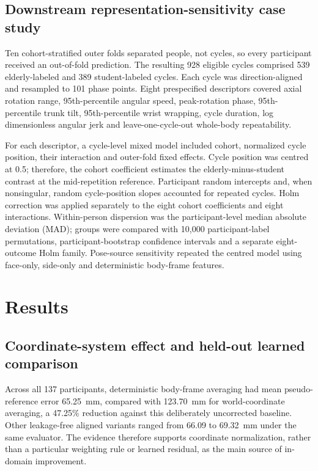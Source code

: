 \documentclass[lineno,pdflatex,sn-mathphys-num]{sn-jnl}
\begin{document}
\subsection{Downstream representation-sensitivity case study}

Ten cohort-stratified outer folds separated people, not cycles, so every
participant received an out-of-fold prediction. The resulting 928 eligible
cycles comprised 539 elderly-labeled and 389 student-labeled cycles. Each cycle
was direction-aligned and resampled to 101 phase points. Eight prespecified
descriptors covered axial rotation range, 95th-percentile angular speed,
peak-rotation phase, 95th-percentile trunk tilt, 95th-percentile wrist wrapping,
cycle duration, log dimensionless angular jerk and leave-one-cycle-out
whole-body repeatability.

For each descriptor, a cycle-level mixed model included cohort, normalized
cycle position, their interaction and outer-fold fixed effects. Cycle position
was centred at 0.5; therefore, the cohort coefficient estimates the
elderly-minus-student contrast at the mid-repetition reference. Participant
random intercepts and, when nonsingular, random cycle-position slopes accounted
for repeated cycles. Holm correction was applied separately to the eight
cohort coefficients and eight interactions. Within-person dispersion was the
participant-level median absolute deviation (MAD); groups were compared with
10,000 participant-label permutations, participant-bootstrap confidence
intervals and a separate eight-outcome Holm family. Pose-source sensitivity
repeated the centred model using face-only, side-only and deterministic
body-frame features.

\section{Results}\label{sec:results}

\subsection{Coordinate-system effect and held-out learned comparison}

Across all 137 participants, deterministic body-frame averaging had mean
pseudo-reference error 65.25~mm, compared with 123.70~mm for world-coordinate
averaging, a 47.25\% reduction against this deliberately uncorrected baseline.
Other leakage-free aligned variants ranged from 66.09 to 69.32~mm under the
same evaluator. The evidence therefore supports coordinate normalization,
rather than a particular weighting rule or learned residual, as the main
source of in-domain improvement.
\end{document}
